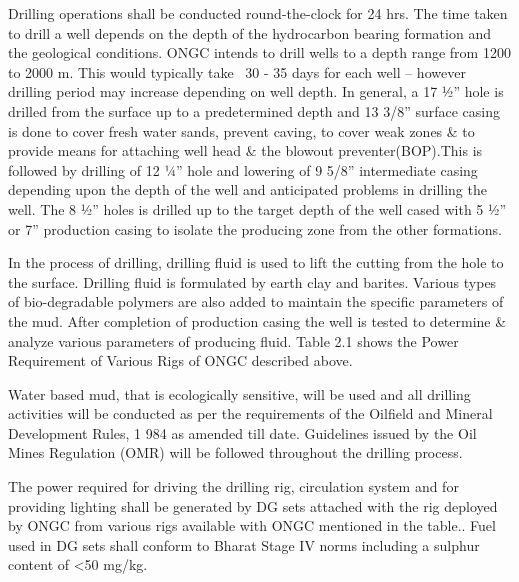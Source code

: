 Drilling operations shall be conducted round-the-clock for 24 hrs. The time taken to drill a
well depends on the depth of the hydrocarbon bearing formation and the geological conditions.
ONGC intends to drill wells to a depth range from 1200 to 2000 m. This would typically take ~30 - 35 days
for each well – however drilling period may increase depending on well depth.
In general, a 17 1⁄2” hole is drilled from the surface up to a predetermined depth and 13 3/8” surface casing is done to cover fresh water sands, prevent caving, to cover weak zones \& to provide means for attaching well head \& the blowout preventer(BOP).This is followed by drilling of 12 1⁄4” hole and lowering of 9 5/8” intermediate casing depending upon the depth of the well and anticipated problems in drilling the well. The 8 1⁄2” holes is drilled up to the target depth of the well cased with 5 1⁄2” or 7” production casing to isolate the producing zone from the other formations.

\vspace{1em}

In the process of drilling, drilling fluid is used to lift the cutting from the hole to the surface.
Drilling fluid is formulated by earth clay and barites. Various types of bio-degradable polymers are
also added to maintain the specific parameters of the mud. After completion of production casing
the well is tested to determine \& analyze various parameters of producing fluid.
Table 2.1 shows the Power Requirement of Various Rigs of ONGC described above.

\vspace{1em}

Water based mud, that is ecologically sensitive, will be used and all drilling activities will
be conducted as per the requirements of the Oilfield and Mineral Development Rules, 1
984 as amended till date. Guidelines issued by the Oil Mines Regulation (OMR) will be followed
throughout the drilling process.

\vspace{1em}
The power required for driving the drilling rig, circulation system and for providing lighting
shall be generated by DG sets attached with the rig deployed by ONGC from various
rigs available with ONGC mentioned in the table.. Fuel used in DG sets shall conform to
Bharat Stage IV norms including a sulphur content of <50 mg/kg.


